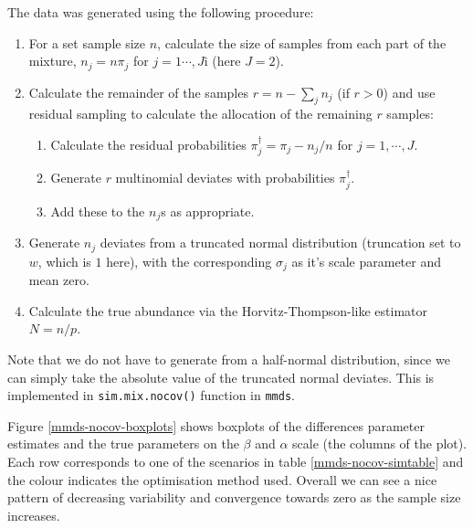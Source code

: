 The data was generated using the following procedure:
\begin{enumerate}
	\item For a set sample size $n$, calculate the size of samples from each part of the mixture, $n_j = n \pi_j$ for $j=1\cdots,J$i (here $J=2$).
	\item Calculate the remainder of the samples $r = n-\sum_j n_j $ (if $r>0$) and use residual sampling to calculate the allocation of the remaining $r$ samples:
	\begin{enumerate}
		\item Calculate the residual probabilities $\pi_j^\dagger = \pi_j - n_j/n$ for $j=1,\cdots,J$.
		\item Generate $r$ multinomial deviates with probabilities $\pi_j^\dagger$.
		\item Add these to the $n_j$s as appropriate.
	\end{enumerate}
	\item Generate $n_j$ deviates from a truncated normal distribution (truncation set to $w$, which is $1$ here), with the corresponding $\sigma_j$ as it's scale parameter and mean zero.
	\item Calculate the true abundance via the Horvitz-Thompson-like estimator $N=n/p$.
\end{enumerate}
Note that we do not have to generate from a half-normal distribution, since we can simply take the absolute value of the truncated normal deviates. This is implemented in \texttt{sim.mix.nocov()} function in \texttt{mmds}.

Figure \ref{mmds-nocov-boxplots} shows boxplots of the differences parameter estimates  and the true parameters on the $\beta$ and $\alpha$ scale (the columns of the plot). Each row corresponds to one of the scenarios in table \ref{mmds-nocov-simtable} and the colour indicates the optimisation method used. Overall we can see a nice pattern of decreasing variability and convergence towards zero as the sample size increases.

